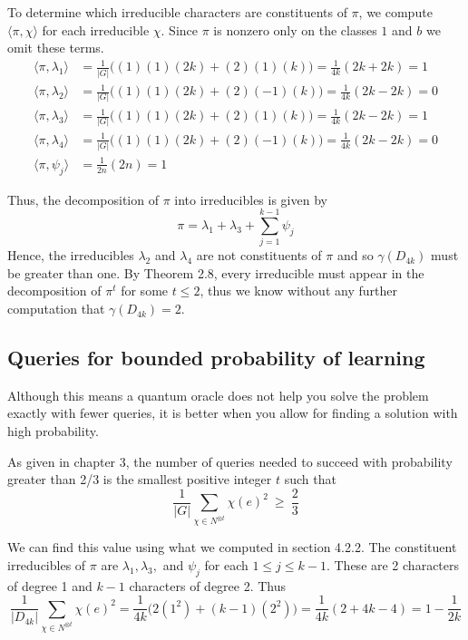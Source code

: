 To determine which irreducible characters are constituents of $\pi$, we compute $\langle \pi, \chi\rangle$ for each 
irreducible $\chi$.  Since $\pi$ is nonzero only on the classes $1$ and $b$ we omit these terms.
\begin{align*}
    \langle \pi, \lambda_1 \rangle &= \frac{1}{|G|}\bigg( (1)(1)(2k) + (2)(1)(k) \bigg)  = \frac{1}{4k}(2k + 2k) = 
    1 \\
%
    \langle \pi, \lambda_2 \rangle &= \frac{1}{|G|}\bigg( (1)(1)(2k) + (2)(-1)(k) \bigg)  = \frac{1}{4k}(2k - 2k) = 
    0 \\
%
    \langle \pi, \lambda_3 \rangle &= \frac{1}{|G|}\bigg( (1)(1)(2k) + (2)(1)(k) \bigg)  = \frac{1}{4k}(2k - 2k) = 
    1 \\
%
    \langle \pi, \lambda_4 \rangle &= \frac{1}{|G|}\bigg( (1)(1)(2k) + (2)(-1)(k) \bigg)  = \frac{1}{4k}(2k - 2k) = 
    0 \\
    \langle \pi, \psi_j \rangle &= \frac{1}{2n}(2n) = 1 
\end{align*}

Thus, the decomposition of $\pi$ into irreducibles is given by
\[
    \pi = \lambda_1 + \lambda_3 + \sum_{j=1}^{k-1} \psi_j
\]
Hence, the irreducibles $\lambda_2$ and $\lambda_4$ are not constituents of $\pi$ and so $\gamma(D_{4k})$ must be 
greater than one. By Theorem 2.8, every irreducible must appear in the decomposition of $\pi^t$ for some $t \leq 
2$, thus we know without any further computation that $\gamma(D_{4k}) = 2$.

\subsection{Queries for bounded probability of learning}
Although this means a quantum oracle does not help you solve the problem exactly with fewer queries, it is better 
when you allow for finding a solution with high probability.

As given in chapter 3, the number of queries needed to succeed with probability greater than 2/3 is the smallest 
positive integer $t$ such that
\[
    \frac{1}{|G|} \sum_{\chi \in N^{\otimes t}} \chi(e)^2  \ \geq\  \frac{2}{3}
\]

We can find this value using what we computed in section 4.2.2.  The constituent irreducibles of $\pi$ are 
$\lambda_1, \lambda_3,$ and $\psi_j$ for each $1 \leq j \leq k-1$. These are 2 characters of degree 1 and $k-1$ 
characters of degree 2. Thus
\[
    \frac{1}{|D_{4k}|} \sum_{\chi \in N^{\otimes t}} \chi(e)^2 = \frac{1}{4k}\bigl( 2(1^2) + (k-1)(2^2) \bigr) = 
    \frac{1}{4k}(2 + 4k - 4) = 1 - \frac{1}{2k}
\]

